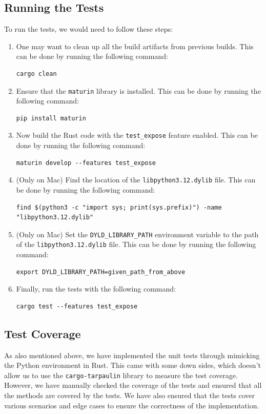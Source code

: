 \documentclass[review]{AIM_report}
\begin{document}
\subsection{Running the Tests}
To run the tests, we would need to follow these steps:
\begin{enumerate}
    \item One may want to clean up all the build artifacts from previous builds. This can be done by running the following command:
          \begin{verbatim}cargo clean
    \end{verbatim}
    \item Ensure that the \texttt{maturin} library is installed. This can be done by running the following command:
          \begin{verbatim}pip install maturin
    \end{verbatim}
    \item Now build the Rust code with the \texttt{test\_expose} feature enabled. This can be done by running the following command:
          \begin{verbatim}maturin develop --features test_expose
    \end{verbatim}
    \item (Only on Mac) Find the location of the \texttt{libpython3.12.dylib} file. This can be done by running the following command:
          \begin{verbatim}find $(python3 -c "import sys; print(sys.prefix)") -name "libpython3.12.dylib"
    \end{verbatim}
    \item (Only on Mac) Set the \texttt{DYLD\_LIBRARY\_PATH} environment variable to the path of the \texttt{libpython3.12.dylib} file. This can be done by running the following command:
          \begin{verbatim}export DYLD_LIBRARY_PATH=given_path_from_above
    \end{verbatim}
    \item Finally, run the tests with the following command:
          \begin{verbatim}cargo test --features test_expose
    \end{verbatim}
\end{enumerate}

\subsection{Test Coverage}
As also mentioned above, we have implemented the unit tests through mimicking the Python environment in Rust.
This came with some down sides, which doesn't allow us to use the \texttt{cargo-tarpaulin} library to measure the test coverage.
However, we have manually checked the coverage of the tests and ensured that all the methods are covered by the tests. We have also ensured that the tests cover various scenarios and edge cases to ensure the correctness of the implementation.
\end{document}
